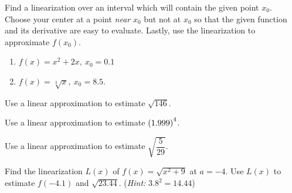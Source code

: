 \documentclass[answers]{exam}
\begin{document}
\pagebreak
\begin{ex*}
  Find a linearization over an interval which will contain the given point $x_0$. Choose your center at a point \textit{near} $x_0$ but not at $x_0$ so that the given function and its derivative are easy to evaluate. Lastly, use the linearization to approximate $f(x_0)$.
\end{ex*}
\begin{enumerate}[label=\alph*), itemsep=\stretch{1}]
  \item $f(x)=x^2+2x,\ x_0=0.1$
  \item $f(x)=\sqrt[3]{x},\ x_0=8.5$.
\end{enumerate}
\pagebreak

\begin{ex*}
  Use a linear approximation to estimate $\sqrt{146}$.
\end{ex*}

\begin{ex*}
  Use a linear approximation to estimate ${\left(1.999\right)}^4$.
\end{ex*}

\begin{ex*}
  Use a linear approximation to estimate $\sqrt{\dfrac{5}{29}}$.
\end{ex*}
\pagebreak

\begin{ex*}
  Find the linearization $L(x)$ of $f(x)=\sqrt{x^2+9}$ at $a=-4$. Use $L(x)$ to estimate $f(-4.1)$ and $\sqrt{23.44}$. (\textit{Hint:} $3.8^2=14.44$)
\end{ex*}
  
\end{document}
